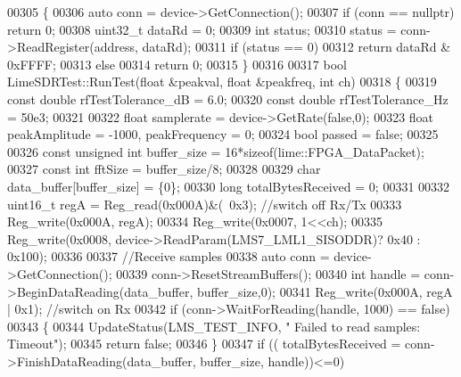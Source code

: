 \begin{DoxyCode}
{{{00305 \{
00306     \textcolor{keyword}{auto} conn = device->GetConnection();
00307     \textcolor{keywordflow}{if} (conn == \textcolor{keyword}{nullptr}) \textcolor{keywordflow}{return} 0;
00308     uint32\_t dataRd = 0;
00309     \textcolor{keywordtype}{int} status;
00310     status = conn->ReadRegister(address, dataRd);
00311     \textcolor{keywordflow}{if} (status == 0)
00312         \textcolor{keywordflow}{return} dataRd & 0xFFFF;
00313     \textcolor{keywordflow}{else}
00314         \textcolor{keywordflow}{return} 0;
00315 \}
00316 
00317 \textcolor{keywordtype}{bool} LimeSDRTest::RunTest(\textcolor{keywordtype}{float} &peakval, \textcolor{keywordtype}{float} &peakfreq, \textcolor{keywordtype}{int} ch)
00318 \{
00319     \textcolor{keyword}{const} \textcolor{keywordtype}{double} rfTestTolerance\_dB = 6.0;
00320     \textcolor{keyword}{const} \textcolor{keywordtype}{double} rfTestTolerance\_Hz = 50e3;
00321 
00322     \textcolor{keywordtype}{float} samplerate = device->GetRate(\textcolor{keyword}{false},0);
00323     \textcolor{keywordtype}{float} peakAmplitude = -1000, peakFrequency = 0;
00324     \textcolor{keywordtype}{bool} passed = \textcolor{keyword}{false};
00325 
00326     \textcolor{keyword}{const} \textcolor{keywordtype}{unsigned} \textcolor{keywordtype}{int} buffer\_size = 16*\textcolor{keyword}{sizeof}(lime::FPGA_DataPacket);
00327     \textcolor{keyword}{const} \textcolor{keywordtype}{int} fftSize = buffer\_size/8;
00328 
00329     \textcolor{keywordtype}{char} data\_buffer[buffer\_size] = \{0\};
00330     \textcolor{keywordtype}{long} totalBytesReceived = 0;
00331 
00332     uint16\_t regA = Reg\_read(0x000A)&(~0x3);     \textcolor{comment}{//switch off Rx/Tx}
00333     Reg\_write(0x000A, regA);
00334     Reg\_write(0x0007, 1<<ch);
00335     Reg\_write(0x0008, device->ReadParam(LMS7_LML1_SISODDR)? 0x40 : 0x100);
00336 
00337     \textcolor{comment}{//Receive samples}
00338     \textcolor{keyword}{auto} conn = device->GetConnection();
00339     conn->ResetStreamBuffers();
00340     \textcolor{keywordtype}{int} handle = conn->BeginDataReading(data\_buffer, buffer\_size,0);
00341     Reg\_write(0x000A, regA | 0x1); \textcolor{comment}{//switch on Rx}
00342     \textcolor{keywordflow}{if} (conn->WaitForReading(handle, 1000) == \textcolor{keyword}{false})
00343     \{
00344         UpdateStatus(LMS_TEST_INFO, \textcolor{stringliteral}{"  Failed to read samples: Timeout"});
00345         \textcolor{keywordflow}{return} \textcolor{keyword}{false};
00346     \}
00347     \textcolor{keywordflow}{if} (( totalBytesReceived =  conn->FinishDataReading(data\_buffer, buffer\_size, handle))<=0)
}}}
\end{DoxyCode}
